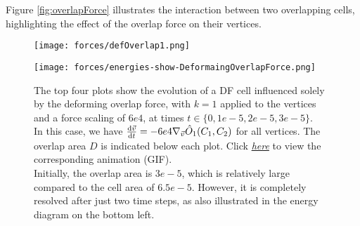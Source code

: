 Figure \ref{fig:overlapForce} illustrates the interaction between two overlapping cells, highlighting the effect of the overlap force on their vertices.

\begin{figure}[htbp]
	\centering
	\texttt{[image: forces/defOverlap1.png]}\\[1ex]
	\begin{minipage}[c]{0.35\textwidth}
		\texttt{[image: forces/energies-show-DeformaingOverlapForce.png]}
	\end{minipage}\hfill
	\begin{minipage}[c]{0.6\textwidth}
		\caption{
			The top four plots show the evolution of a DF cell influenced solely by the deforming overlap force, with $k=1$ applied to the vertices and a force scaling of $6e4$, at times $t \in \{0, 1e-5, 2e-5, 3e-5\}$.\\
			In this case, we have $\frac{\mathrm{d} \vec{v}}{\mathrm{d} t} = - 6e4 \nabla_{\vec{v}} \hat{O}_1(C_1, C_2)$ for all vertices.
			The overlap area $D$ is indicated below each plot.
			Click \href{https://github.com/tivo476c/FlexibleCellModel/blob/master/figures/gifs/showForces/show-DeformaingOverlapForce.gif}{\textit{here}} to view the corresponding animation (GIF).\\
			Initially, the overlap area is $3e-5$, which is relatively large compared to the cell area of $6.5e-5$. 
			However, it is completely resolved after just two time steps, as also illustrated in the energy diagram on the bottom left.
		}
		\label{fig:deformingOverlapForce}
	\end{minipage}
\end{figure}

